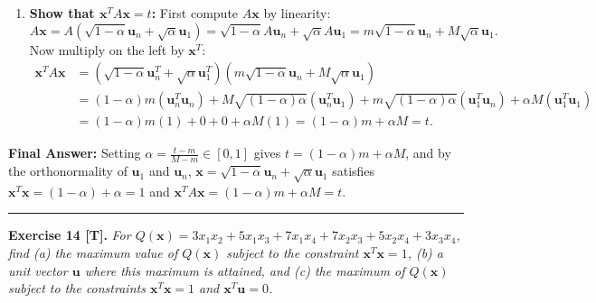 \documentclass[11pt, letterpaper]{article}
\theoremstyle{definition}
\theoremstyle{remark}
\begin{document}
\begin{enumerate}[label=\textbf{Step \arabic*:}]
\begin{align*}
    &= (1-\alpha)(1) + \sqrt{(1-\alpha)\alpha}(0 + 0) + \alpha(1) = 1 - \alpha + \alpha = 1.
    \end{align*}
    \item \textbf{Show that $\mathbf{x}^T A \mathbf{x} = t$:}
    First compute $A\mathbf{x}$ by linearity:
    \[
    A\mathbf{x} = A\left(\sqrt{1-\alpha}\mathbf{u}_n + \sqrt{\alpha}\mathbf{u}_1\right) = \sqrt{1-\alpha}A\mathbf{u}_n + \sqrt{\alpha}A\mathbf{u}_1 = m\sqrt{1-\alpha}\mathbf{u}_n + M\sqrt{\alpha}\mathbf{u}_1.
    \]
    Now multiply on the left by $\mathbf{x}^T$:
    \begin{align*}
    \mathbf{x}^T A \mathbf{x} &= \left(\sqrt{1-\alpha}\mathbf{u}_n^T + \sqrt{\alpha}\mathbf{u}_1^T\right)\left(m\sqrt{1-\alpha}\mathbf{u}_n + M\sqrt{\alpha}\mathbf{u}_1\right) \\
    &= (1-\alpha)m(\mathbf{u}_n^T \mathbf{u}_n) + M\sqrt{(1-\alpha)\alpha}(\mathbf{u}_n^T \mathbf{u}_1) + m\sqrt{(1-\alpha)\alpha}(\mathbf{u}_1^T \mathbf{u}_n) + \alpha M(\mathbf{u}_1^T \mathbf{u}_1) \\
    &= (1-\alpha)m(1) + 0 + 0 + \alpha M(1) = (1-\alpha)m + \alpha M = t.
    \end{align*}
\end{enumerate}
\textbf{Final Answer:} Setting $\alpha = \frac{t-m}{M-m} \in [0,1]$ gives $t = (1-\alpha)m + \alpha M$, and by the orthonormality of $\mathbf{u}_1$ and $\mathbf{u}_n$, $\mathbf{x} = \sqrt{1-\alpha}\mathbf{u}_n + \sqrt{\alpha}\mathbf{u}_1$ satisfies $\mathbf{x}^T\mathbf{x} = (1-\alpha) + \alpha = 1$ and $\mathbf{x}^T A \mathbf{x} = (1-\alpha)m + \alpha M = t$.

\medskip
\hrule
\medskip

\textbf{Exercise 14 [T].} \emph{For $Q(\mathbf{x}) = 3x_1x_2 + 5x_1x_3 + 7x_1x_4 + 7x_2x_3 + 5x_2x_4 + 3x_3x_4$, find (a) the maximum value of $Q(\mathbf{x})$ subject to the constraint $\mathbf{x}^T\mathbf{x} = 1$, (b) a unit vector $\mathbf{u}$ where this maximum is attained, and (c) the maximum of $Q(\mathbf{x})$ subject to the constraints $\mathbf{x}^T\mathbf{x} = 1$ and $\mathbf{x}^T\mathbf{u} = 0$.}
\end{document}
